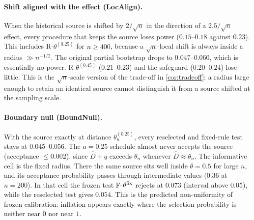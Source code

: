 \paragraph{Shift aligned with the effect (LocAlign).} When the historical source is shifted by $2/\sqrt n$ in the direction of a $2.5/\sqrt n$ effect, every procedure that keeps the source loses power ($0.15$--$0.18$ against $0.23$). This includes R-$\theta^{(0.25)}$ for $n\ge400$, because a $\sqrt n$-local shift is always inside a radius $\gg n^{-1/2}$. The original partial bootstrap drops to $0.047$--$0.060$, which is essentially no power. R-$\theta^{(0.45)}$ ($0.21$--$0.23$) and the safeguard ($0.20$--$0.24$) lose little. This is the $\sqrt n$-scale version of the trade-off in \cref{cor:tradeoff}: a radius large enough to retain an identical source cannot distinguish it from a source shifted at the sampling scale.

\paragraph{Boundary null (BoundNull).} With the source exactly at distance $\theta^{(0.25)}_n$, every reselected and fixed-rule test stays at $0.045$--$0.056$. The $a=0.25$ schedule almost never accepts the source (acceptance $\le0.002$), since $\hat D+q$ exceeds $\theta_n$ whenever $\hat D\approx\theta_n$. The informative cell is the fixed radius. There the same source sits well inside $\theta=0.5$ for large $n$, and its acceptance probability passes through intermediate values ($0.36$ at $n=200$). In that cell the frozen test F-$\theta^{\rm fix}$ rejects at $0.073$ (interval above $0.05$), while the reselected test gives $0.054$. This is the predicted non-uniformity of frozen calibration: inflation appears exactly where the selection probability is neither near $0$ nor near $1$.
